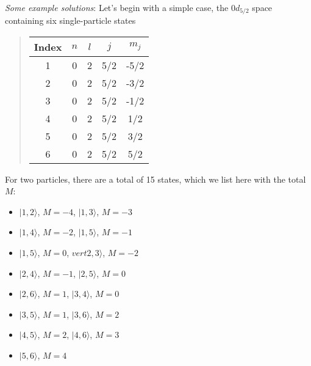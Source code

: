 \documentclass[%
oneside,                 %
final,                   %
10pt]{article}
\begin{document}
\paragraph{}

\emph{Some example solutions}:  Let's begin with a simple case, the $0d_{5/2}$ space containing six single-particle states


\begin{quote}
\begin{tabular}{ccccc}
\hline
\multicolumn{1}{c}{ Index } & \multicolumn{1}{c}{ $n$ } & \multicolumn{1}{c}{ $l$ } & \multicolumn{1}{c}{ $j$ } & \multicolumn{1}{c}{ $m_j$ } \\
\hline
1     & 0   & 2   & 5/2 & -5/2  \\
2     & 0   & 2   & 5/2 & -3/2  \\
3     & 0   & 2   & 5/2 & -1/2  \\
4     & 0   & 2   & 5/2 & 1/2   \\
5     & 0   & 2   & 5/2 & 3/2   \\
6     & 0   & 2   & 5/2 & 5/2   \\
\hline
\end{tabular}
\end{quote}

\noindent
For two particles, there are a total of 15 states, which we list here with the total $M$:
\begin{itemize}
\item $\vert 1,2 \rangle$, $M= -4$,  $\vert 1,3 \rangle$, $M= -3$

\item $\vert  1,4 \rangle$, $M= -2$, $\vert 1,5 \rangle$, $M= -1$

\item $\vert 1,5 \rangle$, $M= 0$, $vert 2,3 \rangle$, $M= -2$

\item $\vert 2,4 \rangle$, $M= -1$, $\vert 2,5 \rangle$, $M= 0$

\item $\vert 2,6 \rangle$, $M= 1$, $\vert 3,4 \rangle$, $M= 0$

\item $\vert 3,5 \rangle$, $M= 1$, $\vert 3,6 \rangle$, $M= 2$

\item $\vert 4,5 \rangle$, $M= 2$, $\vert 4,6 \rangle$, $M= 3$

\item $\vert 5,6 \rangle$, $M= 4$
\end{itemize}
\end{document}
